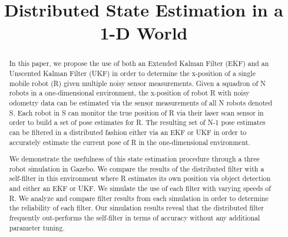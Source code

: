 \documentclass[conference]{IEEEtran} \usepackage[T1]{fontenc} \usepackage[backend=biber, style=ieee]{biblatex}
\begin{document}
\title{Distributed State Estimation in a 1-D World}


\author{   }

\maketitle

\begin{abstract}
In this paper, we propose the use of both an Extended Kalman Filter (EKF) and an Unscented Kalman
Filter (UKF) in order to determine the x-position of a single mobile robot (R) given multiple noisy sensor measurements.
Given a squadron of N robots in a one-dimensional environment, the x-position of robot R with noisy odometry data can be
estimated via the sensor measurements of all N robots denoted S. Each robot in S can monitor the true position of R via
their laser scan sensor in order to build a set of pose estimates for R. The resulting set of N-1 pose estimates can be
filtered in a distributed fashion either via an EKF or UKF in order to accurately estimate the current pose of R in the
one-dimensional environment.

We demonstrate the usefulness of this state estimation procedure through a three robot simulation in Gazebo. We compare
the results of the distributed filter with a self-filter in this environment where R estimates its own position via
object detection and either an EKF or UKF. We simulate the use of each filter with varying speeds of R. We analyze and
compare filter results from each simulation in order to determine the reliability of each filter. Our simulation results
reveal that the distributed filter frequently out-performs the self-filter in terms of accuracy without any additional
parameter tuning.
\end{abstract}
\end{document}
